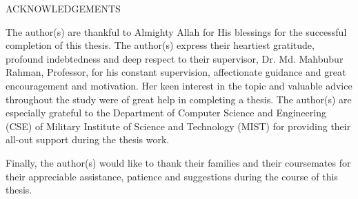 \par
\begin{center}
  {{\Large ACKNOWLEDGEMENTS}}\\[60pt]
\end{center}

\justifying
The author(s) are thankful to Almighty Allah for His blessings for the successful
completion of this thesis. The author(s) express their heartiest gratitude, profound indebtedness and deep respect to their supervisor, Dr. Md. Mahbubur Rahman, Professor, for his constant supervision, affectionate guidance and great encouragement and motivation. Her keen interest in the topic and valuable advice throughout the study were of great help in completing a thesis. The author(s) are especially grateful to the Department of Computer Science and
Engineering (CSE) of Military Institute of Science and Technology (MIST) for providing their all-out support during the thesis work.



Finally,  the author(s) would like to thank their families and their coursemates for
their appreciable assistance, patience and suggestions during the
course of this thesis.

\endinput
